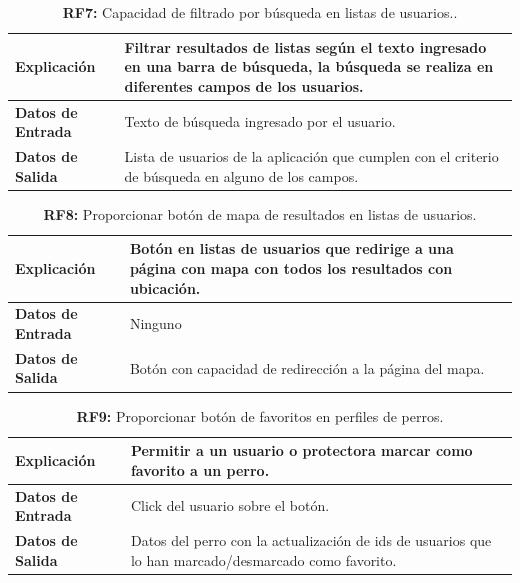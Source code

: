 \documentclass[a4paper, 12pt]{article}
\begin{document}
\begin{table}[H]
\captionsetup{justification=raggedright,singlelinecheck=false}
\caption{\textbf{RF7:} Capacidad de filtrado por búsqueda en listas de usuarios..}
\label{tab:RF7}
	\begin{tabular}{|m{5cm}|m{10cm}|}
\hline
	\textbf{Explicación} & Filtrar resultados de listas según el texto ingresado en una barra de búsqueda, la búsqueda se realiza en diferentes campos de los usuarios. \\ 
	\hline
	\textbf{Datos de Entrada} & Texto de búsqueda ingresado por el usuario. \\ 
	\hline
	\textbf{Datos de Salida} &  Lista de usuarios de la aplicación que cumplen con el criterio de búsqueda en alguno de los campos. \\ 
	\hline
\end{tabular}
\end{table}

\begin{table}[H]
\captionsetup{justification=raggedright,singlelinecheck=false}
\caption{\textbf{RF8:}  Proporcionar botón de mapa de resultados en listas de usuarios.}
\label{tab:RF8}
	\begin{tabular}{|m{5cm}|m{10cm}|}
	\hline
	\textbf{Explicación} & Botón en listas de usuarios que redirige a una página con mapa con todos los resultados con ubicación. \\ 
	\hline
	\textbf{Datos de Entrada} & Ninguno \\ 
	\hline
	\textbf{Datos de Salida} & Botón con capacidad de redirección a la página del mapa. \\ 
	\hline
\end{tabular}
\end{table}

\begin{table}[H]
\captionsetup{justification=raggedright,singlelinecheck=false}
\caption{\textbf{RF9:} Proporcionar botón de favoritos en perfiles de perros.}
\label{tab:RF9}
	\begin{tabular}{|m{5cm}|m{10cm}|}
	\hline
	\textbf{Explicación} & Permitir a un usuario o protectora marcar como favorito a un perro. \\ 
	\hline
	\textbf{Datos de Entrada} & Click del usuario sobre el botón. \\ 
	\hline
	\textbf{Datos de Salida} & Datos del perro con la actualización de ids de usuarios que lo han marcado/desmarcado como favorito.\\ 
	\hline
\end{tabular}
\end{table}
\end{document}
